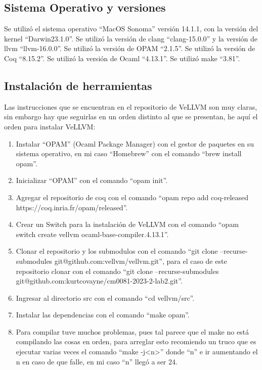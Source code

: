 \documentclass{hw-template}
\begin{document}
\subsection{Sistema Operativo y versiones}
Se utilizó el sistema operativo ``MacOS Sonoma'' versión 14.1.1, con la versión del kernel ``Darwin23.1.0''. Se utilizó la versión de clang ``clang-15.0.0'' y la versión de llvm ``llvm-16.0.0''. Se utilizó la versión de OPAM ``2.1.5''. Se utilizó la versión de Coq ``8.15.2''. Se utilizó la versión de Ocaml ``4.13.1''.  Se utilizó make ``3.81''.

\subsection{Instalación de herramientas}
Las instrucciones que se encuentran en el repositorio de VeLLVM \cite{vellvm} son muy claras, sin embargo hay que seguirlas en un orden distinto al que se presentan, he aquí el orden para instalar VeLLVM:
\begin{enumerate}
    \item Instalar ``OPAM'' \cite{opam} (Ocaml Package Manager) con el gestor de paquetes en su sistema operativo, en mi caso ``Homebrew'' \cite{homebrew} con el comando ``brew install opam''.
    \item Inicializar ``OPAM'' con el comando ``opam init''.
    \item Agregar el repositorio de coq con el comando ``opam repo add coq-released https://coq.inria.fr/opam/released''.
    \item Crear un Switch para la instalación de VeLLVM con el comando ``opam switch create vellvm ocaml-base-compiler.4.13.1''.
    \item Clonar el repositorio y los submodulos con el comando ``git clone --recurse-submodules git@github.com:vellvm/vellvm.git'', para el caso de este repositorio clonar con el comando ``git clone --recurse-submodules git@github.com:kurtcovayne/cm0081-2023-2-lab2.git''.
    \item Ingresar al directorio src con el comando ``cd vellvm/src''.
    \item Instalar las dependencias con el comando ``make opam''.
    \item Para compilar tuve muchos problemas, pues tal parece que el make no está compilando las cosas en orden, para arreglar esto recomiendo un truco que es ejecutar varias veces el comando ``make -j<n>'' donde ``n'' e ir aumentando el n en caso de que falle, en mi caso ``n'' llegó a ser 24.
\end{enumerate}
\end{document}
